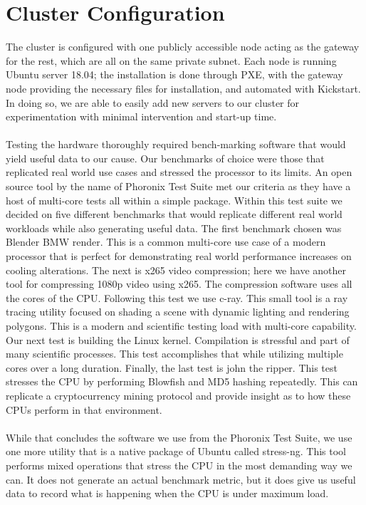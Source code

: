 \documentclass[sigconf]{acmart}
\begin{document}
\section{Cluster Configuration}
The cluster is configured with one publicly accessible node acting as the gateway for the rest, which are all on the same private subnet. Each node is running Ubuntu server 18.04; the installation is done through PXE, with the gateway node providing the necessary files for installation, and automated with Kickstart. In doing so, we are able to easily add new servers to our cluster for experimentation with minimal intervention and start-up time.
\\\\
Testing the hardware thoroughly required bench-marking software that would yield useful data to our cause. Our benchmarks of choice were those that replicated real world use cases and stressed the processor to its limits. An open source tool by the name of Phoronix Test Suite met our criteria as they have a host of multi-core tests all within a simple package. Within this test suite we decided on five different benchmarks that would replicate different real world workloads while also generating useful data. The first benchmark chosen was Blender BMW render. This is a common multi-core use case of a modern processor that is perfect for demonstrating real world performance increases on cooling alterations. The next is x265 video compression; here we have another tool for compressing 1080p video using x265. The compression software uses all the cores of the CPU. Following this test we use c-ray. This small tool is a ray tracing utility focused on shading a scene with dynamic lighting and rendering polygons. This is a modern and scientific testing load with multi-core capability. Our next test is building the Linux kernel. Compilation is stressful and part of many scientific processes. This test accomplishes that while utilizing multiple cores over a long duration. Finally, the last test is john the ripper. This test stresses the CPU by performing Blowfish and MD5 hashing repeatedly. This can replicate a cryptocurrency mining protocol and provide insight as to how these CPUs perform in that environment.
\\\\
While that concludes the software we use from the Phoronix Test Suite, we use one more utility that is a native package of Ubuntu called stress-ng. This tool performs mixed operations that stress the CPU in the most demanding way we can. It does not generate an actual benchmark metric, but it does give us useful data to record what is happening when the CPU is under maximum load.
\end{document}
